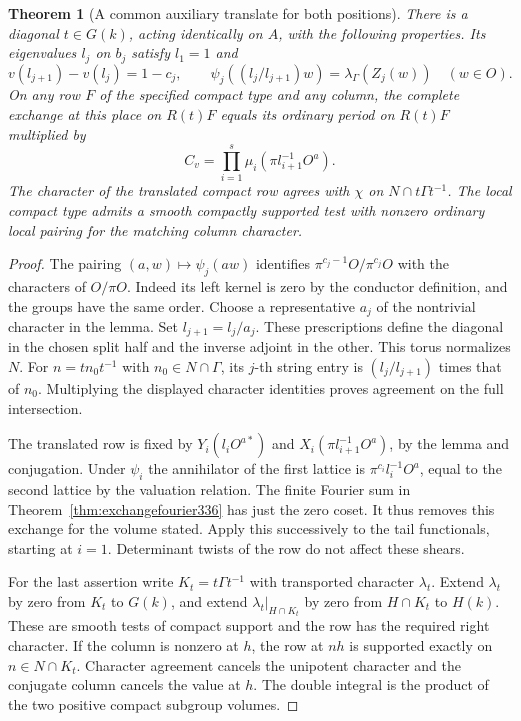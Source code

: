 \documentclass[a4paper,11pt]{article}
\newtheorem{theorem}[proposition]{Theorem}
\theoremstyle{definition}
\theoremstyle{remark}
\numberwithin{equation}{section}
\begin{document}
\begin{theorem}[A common auxiliary translate for both positions]\label{thm:auxiliaryflag339}
There is a diagonal \(t\in G(k)\), acting identically on \(A\),
with the following properties. Its eigenvalues \(l_j\) on \(b_j\)
satisfy \(l_1=1\) and
\[
 v(l_{j+1})-v(l_j)=1-c_j,\qquad
       \psi_j((l_j/l_{j+1})w)=\lambda_\Gamma(Z_j(w))
                           \quad(w\in O).
\]
On any row \(F\) of the specified compact type and any column,
the complete exchange at this place on \(R(t)F\) equals its
ordinary period on \(R(t)F\) multiplied by
\[
             C_v=\prod_{i=1}^s\mu_i(\pi l_{i+1}^{-1} O^a).
\]
The character of the translated compact row agrees with \(\chi\)
on \(N\cap t\Gamma t^{-1}\). The local compact type admits a
smooth compactly supported test with nonzero ordinary local
pairing for the matching column character.
\end{theorem}
\begin{proof}
The pairing \((a,w)\mapsto\psi_j(aw)\) identifies
\(\pi^{c_j-1}O/\pi^{c_j}O\) with the characters of \(O/\pi O\).
Indeed its left kernel is zero by the conductor definition, and
the groups have the same order. Choose a representative \(a_j\)
of the nontrivial character in the lemma. Set \(l_{j+1}=l_j/a_j\).
These prescriptions define the diagonal in the chosen split
half and the inverse adjoint in the other. This torus normalizes
\(N\). For \(n=t n_0t^{-1}\) with \(n_0\in N\cap\Gamma\), its
\(j\)-th string entry is \((l_j/l_{j+1})\) times that of \(n_0\).
Multiplying the displayed character identities proves agreement
on the full intersection.

The translated row is fixed by \(Y_i(l_i O^{a*})\) and
\(X_i(\pi l_{i+1}^{-1}O^a)\), by the lemma and conjugation.
Under \(\psi_i\) the annihilator of the first lattice is
\(\pi^{c_i}l_i^{-1} O^a\), equal to the second lattice by the
valuation relation. The finite Fourier sum in
Theorem~\ref{thm:exchangefourier336} has just the zero coset.
It thus removes this exchange for the volume stated. Apply this
successively to the tail functionals, starting at \(i=1\).
Determinant twists of the row do not affect these shears.

For the last assertion write \(K_t=t\Gamma t^{-1}\) with
transported character \(\lambda_t\). Extend \(\lambda_t\) by
zero from \(K_t\) to \(G(k)\), and extend \(\lambda_t|_{H\cap K_t}\)
by zero from \(H\cap K_t\) to \(H(k)\). These are smooth tests of
compact support and the row has the required right character.
If the column is nonzero at \(h\), the row at \(nh\) is supported
exactly on \(n\in N\cap K_t\). Character agreement cancels the
unipotent character and the conjugate column cancels the value
at \(h\). The double integral is the product of the two positive
compact subgroup volumes.
\end{proof}
\end{document}
